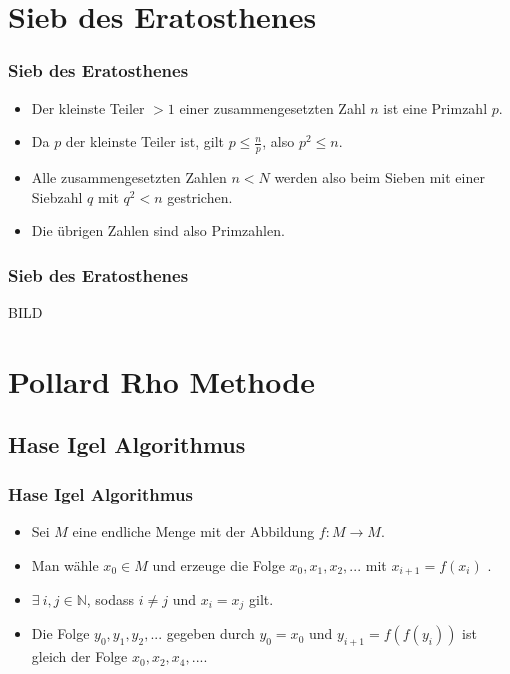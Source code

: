 \documentclass[mathserif]{beamer}
\begin{document}
\section{Sieb des Eratosthenes}

\begin{frame}
  \frametitle{Sieb des Eratosthenes}   %

  \begin{itemize}
  \item<1-> Der kleinste Teiler $> 1$ einer zusammengesetzten Zahl $n$ ist eine Primzahl $p$. 
  \vspace{3mm}
  \item<2-> Da $p$ der kleinste Teiler ist, gilt $p \leq \frac{n}{p}$, also $ p^2 \leq n $.
  \vspace{3mm}
  \item<3-> Alle zusammengesetzten Zahlen $n<N$ werden also beim Sieben mit einer Siebzahl $q$ mit $q^2<n$ gestrichen.
  \vspace{3mm}
  \item<4-> Die \"ubrigen Zahlen sind also Primzahlen.
  \end{itemize}
\end{frame}

\begin{frame}
  \frametitle{Sieb des Eratosthenes}   %
BILD

\end{frame}

\section{Pollard Rho Methode}

\subsection{Hase Igel Algorithmus}

\begin{frame}
  \frametitle{Hase Igel Algorithmus}
  \begin{itemize}
    \item<1-> Sei $M$ eine endliche Menge mit der Abbildung $f : M \rightarrow M$.
      \vspace{3mm}
    \item<2-> Man w\"ahle $x_0 \in M$ und erzeuge die Folge $x_0, x_1, x_2,...$ mit $x_{i+1} = f(x_i)$ .
      \vspace{3mm}
    \item<3-> $\exists \ i,j \in \mathbb{N}$, sodass $i \not= j$ und $x_i = x_j$ gilt.
      \vspace{3mm}
    \item<4-> Die Folge $y_0, y_1, y_2,...$ gegeben durch $y_0=x_0$ und $y_{i+1}=f(f(y_i))$ ist gleich der Folge $x_0,x_2,x_4,...$.
  \end{itemize}
\end{frame}
\end{document}

